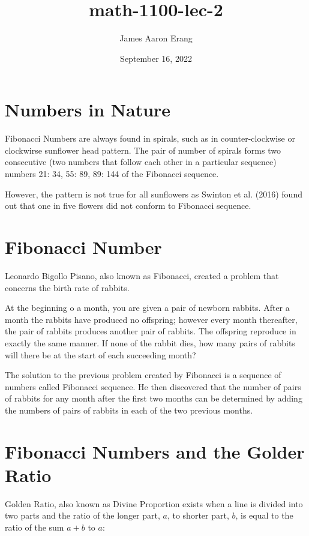 \documentclass[12pt, UTF8]{article}
\title{math-1100-lec-2}
\author{James Aaron Erang}
\date{September 16, 2022}
\begin{document}
	\maketitle
	
	\section*{Numbers in Nature}
	
	Fibonacci Numbers are always found in spirals, such as in counter-clockwise or clockwirse sunflower head pattern. The pair of number of spirals forms two consecutive (two numbers that follow each other in a particular sequence) numbers {21: 34, 55: 89, 89: 144} of the Fibonacci sequence.
	
	However, the pattern is not true for all sunflowers as Swinton et al. (2016) found out that one in five flowers did not conform to Fibonacci sequence.
	
	\section{Fibonacci Number}
	
	Leonardo Bigollo Pisano, also known as Fibonacci, created a problem that concerns the birth rate of rabbits.
	
	\begin{displayquote}
		At the beginning o a month, you are given a pair of newborn rabbits. After a month the rabbits have produced no offspring; however every month thereafter, the pair of rabbits produces another pair of rabbits. The offspring reproduce in exactly the same manner. If none of the rabbit dies, how many pairs of rabbits will there be at the start of each succeeding month?
	\end{displayquote}
	
	The solution to the previous problem created by Fibonacci is a sequence of numbers called Fibonacci sequence. He then discovered that the number of pairs of rabbits for any month after the first two months can be determined by adding the numbers of pairs of rabbits in each of the two previous months.
	
	\section{Fibonacci Numbers and the Golder Ratio}
	
	Golden Ratio, also known as Divine Proportion exists when a line is divided into two parts and the ratio of the longer part, $a$, to shorter part, $b$, is equal to the ratio of the sum $a+b$ to $a$:
	
\end{document}
